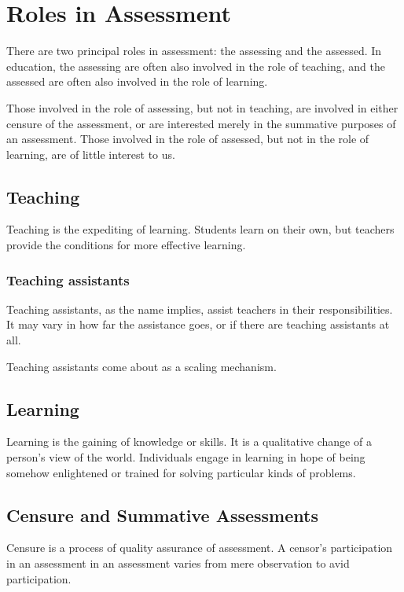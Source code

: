 
\section{Roles in Assessment}

There are two principal roles in assessment: the assessing and the assessed.
In education, the assessing are often also involved in the role of teaching,
and the assessed are often also involved in the role of learning.

Those involved in the role of assessing, but not in teaching, are involved in
either censure of the assessment, or are interested merely in the summative
purposes of an assessment. Those involved in the role of assessed, but not in
the role of learning, are of little interest to us.

\subsection{Teaching}

Teaching is the expediting of learning. Students learn on their own, but
teachers provide the conditions for more effective learning\cite{skinner-1965}.

\subsubsection{Teaching assistants}

Teaching assistants, as the name implies, assist teachers in their
responsibilities. It may vary in how far the assistance goes, or if there are
teaching assistants at all.

Teaching assistants come about as a scaling mechanism.

\subsection{Learning}

Learning is the gaining of knowledge or skills. It is a qualitative change of a
person's view of the world. Individuals engage in learning in hope of being
somehow enlightened or trained for solving particular kinds of problems.

\subsection{Censure and Summative Assessments}

Censure is a process of quality assurance of assessment. A censor's
participation in an assessment in an assessment varies from mere observation to
avid participation.
